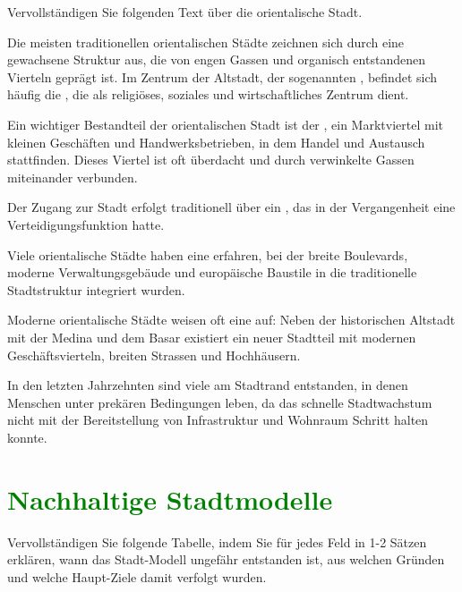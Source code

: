 \begin{questions}
	\droptotalpoints
	
	\question[7] Vervollständigen Sie folgenden Text über die orientalische Stadt.
	
Die meisten traditionellen orientalischen Städte zeichnen sich durch eine gewachsene Struktur aus, die von engen Gassen und organisch entstandenen Vierteln geprägt ist. Im Zentrum der Altstadt, der sogenannten \fillin[Medina][4cm], befindet sich häufig die , die als religiöses, soziales und wirtschaftliches Zentrum dient.

Ein wichtiger Bestandteil der orientalischen Stadt ist der , ein Marktviertel mit kleinen Geschäften und Handwerksbetrieben, in dem Handel und Austausch stattfinden. Dieses Viertel ist oft überdacht und durch verwinkelte Gassen miteinander verbunden.

Der Zugang zur Stadt erfolgt traditionell über ein \fillin[Stadttor][4cm], das in der Vergangenheit eine Verteidigungsfunktion hatte. 

Viele orientalische Städte haben eine  erfahren, bei der breite Boulevards, moderne Verwaltungsgebäude und europäische Baustile in die traditionelle Stadtstruktur integriert wurden.

Moderne orientalische Städte weisen oft eine  auf: Neben der historischen Altstadt mit der Medina und dem Basar existiert ein neuer Stadtteil mit modernen Geschäftsvierteln, breiten Strassen und Hochhäusern.

In den letzten Jahrzehnten sind viele  am Stadtrand entstanden, in denen Menschen unter prekären Bedingungen leben, da das schnelle Stadtwachstum nicht mit der Bereitstellung von Infrastruktur und Wohnraum Schritt halten konnte.
	
	\droptotalpoints
	
	\clearpage
	\section*{\textcolor{Green}{Nachhaltige Stadtmodelle}}
	\question[9] Vervollständigen Sie folgende Tabelle, indem Sie für jedes Feld in 1-2 Sätzen erklären, wann das Stadt-Modell ungefähr entstanden ist, aus welchen Gründen und welche Haupt-Ziele damit verfolgt wurden.
	

\end{questions}
